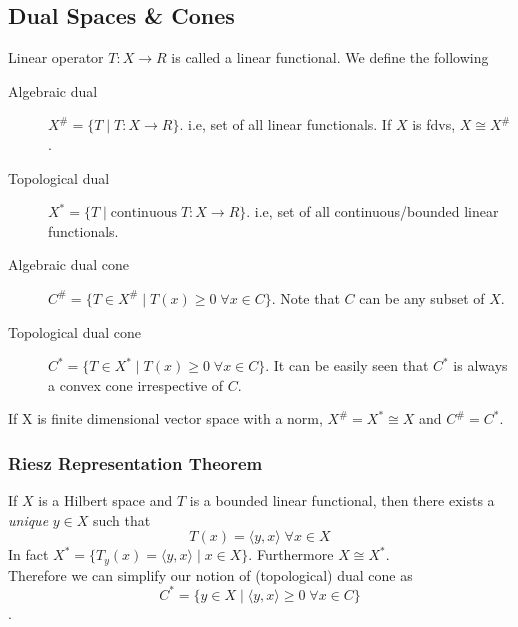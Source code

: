 \documentclass[a4paper,11pt]{article}
\newcommand\inrpd[2]{\langle #1, #2 \rangle}
\begin{document}
\subsection{Dual Spaces \& Cones}
Linear operator $T: X \rightarrow R$ is called a linear functional. We define the following

\begin{description}
\item[Algebraic dual] $X^\# = \{T \mid T: X \rightarrow R \}$. i.e, set of all linear functionals.
If $X$ is fdvs, $X \cong X^\#$.

\item[Topological dual] $X^* = \{T \mid \text{continuous}\; T: X \rightarrow R \}$. i.e, set of all continuous/bounded linear functionals.

\item[Algebraic dual cone] $C^\# = \{T \in X^\# \mid T(x) \geq 0\; \forall x \in C  \}$. Note that $C$ can be any subset of $X$.

\item[Topological dual cone] $C^* = \{T \in X^* \mid T(x) \geq 0\; \forall x \in C  \}$. It can be easily seen that $C^*$ is always a convex cone irrespective of $C$.
\end{description}

If X is finite dimensional vector space with a norm, $X^\# = X^* \cong X$ and $C^\# = C^*$. 

\subsubsection{Riesz Representation Theorem}
If $X$ is a Hilbert space and $T$ is a bounded linear functional, then there exists a \emph{unique} $y \in X$ such that \[T(x) = \inrpd{y}{x} \; \forall x \in X \]
In fact $X^* =\{T_y(x) = \inrpd{y}{x} \mid x \in X \}$. Furthermore $X \cong X^*$.\\

Therefore we can simplify our notion of (topological) dual cone as \[C^* = \{y \in X \mid \inrpd{y}{x} \geq 0\; \forall x \in C \} \]. 
\end{document}
